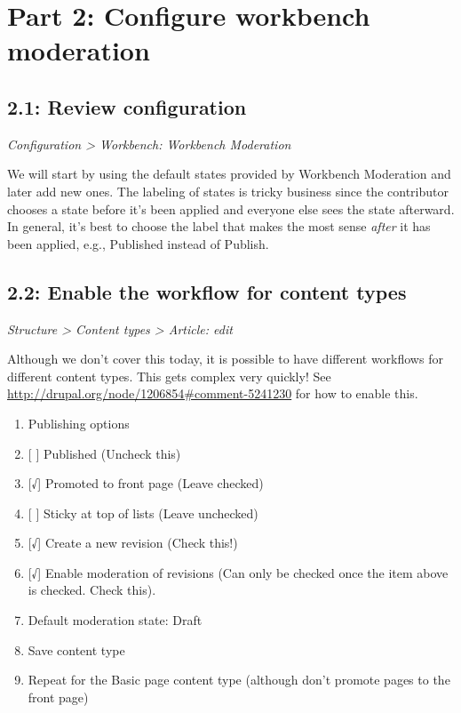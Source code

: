 \documentclass[letterpaper,10pt,english]{sphinxmanual}
\begin{document}
\section{Part 2: Configure workbench moderation}
\label{workbench:part-2-configure-workbench-moderation}

\subsection{2.1: Review configuration}
\label{workbench:review-configuration}
\emph{Configuration \textgreater{} Workbench: Workbench Moderation}

We will start by using the default states provided by Workbench Moderation and later add new ones. The labeling of states is tricky business since the contributor chooses a state before it's been applied and everyone else sees the state afterward. In general, it's best to choose the label that makes the most sense \emph{after} it has been applied, e.g., Published instead of Publish.


\subsection{2.2: Enable the workflow for content types}
\label{workbench:enable-the-workflow-for-content-types}
\emph{Structure \textgreater{} Content types \textgreater{} Article: edit}

Although we don't cover this today, it is possible to have different workflows for different content types. This gets complex very quickly! See \href{http://drupal.org/node/1206854\#comment-5241230}{http://drupal.org/node/1206854\#comment-5241230} for how to enable this.
\begin{enumerate}
\item {} 
Publishing options

\item {} 
{[} {]} Published (Uncheck this)

\item {} 
{[}√{]} Promoted to front page (Leave checked)

\item {} 
{[} {]} Sticky at top of lists (Leave unchecked)

\item {} 
{[}√{]} Create a new revision (Check this!)

\item {} 
{[}√{]} Enable moderation of revisions (Can only be checked once the item above is checked. Check this).

\item {} 
Default moderation state: Draft

\item {} 
Save content type

\item {} 
Repeat for the Basic page content type (although don't promote pages to the front page)

\end{enumerate}
\end{document}
